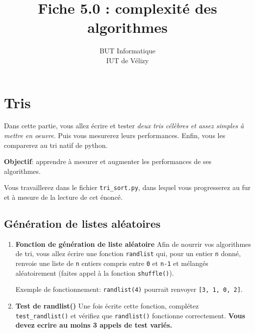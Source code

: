 \documentclass[11pt,a4paper]{article}
\title{Fiche 5.0 : complexité des algorithmes}
\author{BUT Informatique\\
IUT de Vélizy\\
}
\date{}
\newcommand{\checkbox}{$\square$ \smallskip}
\newcounter{exo} \setcounter{exo}{0}
\newenvironment{action}{%
    \begin{enumerate}[\numerotation] \addtocounter{exo}{-1}%
        }{%
    \end{enumerate}
}
\newcommand{\numexoa}{\theexo \addtocounter{exo}{1}}
\newcommand{\numerotation}{\checkbox \smallskip \numexoa.}
\begin{document}
\maketitle





\thispagestyle{empty}

\setcounter{section}{-1}
\section{Tris}
Dans cette partie, vous allez écrire et tester {\em deux tris célèbres et assez simples à mettre en oeuvre}. Puis vous mesurerez leurs performances. Enfin, vous les comparerez au tri natif de python.\ 


{\bf Objectif}: apprendre à mesurer et augmenter les performances de ses algorithmes.\ 

Vous travaillerez dans le fichier {\tt tri\_sort.py}, dans lequel vous progresserez au fur et à mesure de la lecture de cet énoncé.

\subsection*{Génération de listes aléatoires}
\begin{action}
\item {\bf Fonction de génération de liste aléatoire} Afin de nourrir vos algorithmes de tri, vous allez écrire une fonction {\tt randlist} qui, pour un entier {\tt n} donné, renvoie une liste de {\tt n} entiers compris entre {\tt 0} et {\tt n-1} et mélangés aléatoirement (faites appel à la fonction {\tt shuffle()}).\ 

Exemple de fonctionnement: {\tt randlist(4)} pourrait renvoyer {\tt [3, 1, 0, 2]}.
\item {\bf Test de {\bf randlist()}} Une fois écrite cette fonction, complétez {\tt test\_randlist()} et vérifiez que {\tt randlist()} fonctionne correctement. {\bf Vous devez ecrire au moins 3 appels de test variés.}
\end{action}
\end{document}
